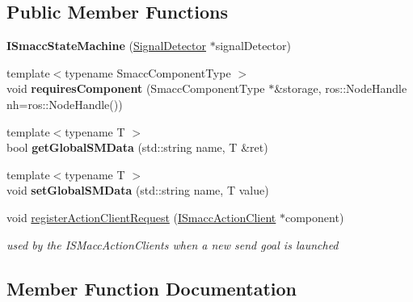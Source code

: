 \subsection*{Public Member Functions}
\begin{DoxyCompactItemize}
\item 
\mbox{\label{classsmacc_1_1ISmaccStateMachine_a497c2185584adbec3298d4000277b75e}} 
{\bfseries I\+Smacc\+State\+Machine} (\hyperlink{classsmacc_1_1SignalDetector}{Signal\+Detector} $\ast$signal\+Detector)
\item 
\mbox{\label{classsmacc_1_1ISmaccStateMachine_ab793672d9cefe89a9d06fdf0d70bc6d8}} 
{\footnotesize template$<$typename Smacc\+Component\+Type $>$ }\\void {\bfseries requires\+Component} (Smacc\+Component\+Type $\ast$\&storage, ros\+::\+Node\+Handle nh=ros\+::\+Node\+Handle())
\item 
\mbox{\label{classsmacc_1_1ISmaccStateMachine_aeda2d6813c6c428bf318a5792e014b61}} 
{\footnotesize template$<$typename T $>$ }\\bool {\bfseries get\+Global\+S\+M\+Data} (std\+::string name, T \&ret)
\item 
\mbox{\label{classsmacc_1_1ISmaccStateMachine_a8588f9e580fbb95b53e2bd2ca3ff1f98}} 
{\footnotesize template$<$typename T $>$ }\\void {\bfseries set\+Global\+S\+M\+Data} (std\+::string name, T value)
\item 
void \hyperlink{classsmacc_1_1ISmaccStateMachine_aacef10d3f0c509612114ff7b21a239d1}{register\+Action\+Client\+Request} (\hyperlink{classsmacc_1_1ISmaccActionClient}{I\+Smacc\+Action\+Client} $\ast$component)
\begin{DoxyCompactList}\small\item\em used by the I\+S\+Macc\+Action\+Clients when a new send goal is launched \end{DoxyCompactList}\end{DoxyCompactItemize}


\subsection{Member Function Documentation}
\mbox{\label{classsmacc_1_1ISmaccStateMachine_aacef10d3f0c509612114ff7b21a239d1}} 
